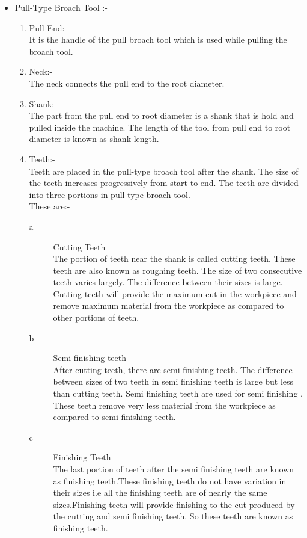 \documentclass[16pt,a4paper]{article}
\begin{document}
\begin{itemize}
\item Pull-Type Broach Tool :-
\begin{enumerate}
\item Pull End:- \\   
It is the handle of the pull broach tool which is used while pulling the broach tool.
\item Neck:- \\  
The neck connects the pull end to the root diameter.
\item Shank:- \\   
The part from the pull end to root diameter is a shank that is hold and pulled inside the machine. The length of the tool from pull end to root diameter is known as shank length.
\item Teeth:-  \\  
Teeth are placed in the pull-type broach tool after the shank. The size of the teeth increases progressively from start to end.
The teeth are divided into three portions in pull type broach tool.
\\These are:-

\begin{description}
\item [a] Cutting Teeth \\  
The portion of teeth near the shank is called cutting teeth. These teeth are also known as roughing teeth. The size of two consecutive teeth varies largely. The difference between their sizes is large. Cutting teeth will provide the maximum cut in the workpiece and remove maximum material from the workpiece as compared to other portions of teeth.
\item [b] Semi finishing teeth \\   
After cutting teeth, there are semi-finishing teeth. The difference between sizes of two teeth in semi finishing teeth is large but less than cutting teeth. Semi finishing teeth are used for semi finishing . These teeth remove very less material from the workpiece as compared to semi finishing teeth.
\item [c] Finishing Teeth \\   
The last portion of teeth after the semi finishing teeth are known as finishing teeth.These finishing teeth do not have variation in their sizes i.e all the finishing teeth are of nearly the same sizes.Finishing teeth will provide finishing to the cut produced by the cutting and semi finishing teeth. So these teeth are known as finishing teeth.
\end{description}


\end{enumerate}
\end{itemize}
\end{document}
